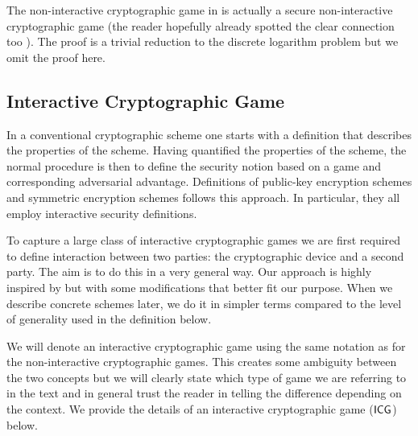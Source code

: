 The non-interactive cryptographic game in  is actually a secure non-interactive cryptographic game (the reader hopefully already spotted the clear connection too ). The proof is a trivial reduction to the discrete logarithm problem but we omit the proof here.

\subsection{Interactive Cryptographic Game}

In a conventional cryptographic scheme one starts with a definition that describes the properties of the scheme. Having quantified the properties of the scheme, the normal procedure is then to define the security notion based on a game and corresponding adversarial advantage. Definitions of public-key encryption schemes and symmetric encryption schemes follows this approach. In particular, they all employ interactive security definitions. 

To capture a large class of interactive cryptographic games we are first required to define interaction between two parties: the cryptographic device and a second party. The aim is to do this in a very general way. Our approach is highly inspired by \cite{DBLP:conf/eurocrypt/MironovS15} but with some modifications that better fit our purpose. When we describe concrete schemes later, we do it in simpler terms compared to the level of generality used in the definition below. 

We will denote an interactive cryptographic game using the same notation as for the non-interactive cryptographic games. This creates some ambiguity between the two concepts but we will clearly state which type of game we are referring to in the text and in general trust the reader in telling the difference depending on the context. We provide the details of an interactive cryptographic game ($\mathsf{ICG}$) below. 

